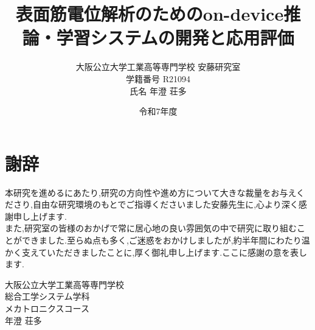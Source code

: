 \documentclass[uplatex,11pt,a4paper]{jsreport}
\title{表面筋電位解析のためのon-device推論・学習システムの開発と応用評価}
\author{大阪公立大学工業高等専門学校 安藤研究室\\
学籍番号 R21094\\
氏名 年澄 荘多}
\date{令和7年度}
\numberwithin{equation}{chapter}
\numberwithin{figure}{chapter}
\numberwithin{table}{chapter}
\begin{document}
\maketitle
\thispagestyle{empty}
\clearpage

\tableofcontents
\clearpage
{}












\renewcommand{\thepage}{\arabic{page}}
\chapter*{謝辞}
本研究を進めるにあたり,研究の方向性や進め方について大きな裁量をお与えくださり,自由な研究環境のもとでご指導くださいました安藤先生に,心より深く感謝申し上げます. \\
また,研究室の皆様のおかげで常に居心地の良い雰囲気の中で研究に取り組むことができました.至らぬ点も多く,ご迷惑をおかけしましたが,約半年間にわたり温かく支えていただきましたことに,厚く御礼申し上げます.ここに感謝の意を表します.

\begin{flushright}
大阪公立大学工業高等専門学校\\
総合工学システム学科\\
メカトロニクスコース\\
年澄 荘多
\end{flushright}
\clearpage
\renewcommand{\thepage}{\arabic{page}}

\appendix
\renewcommand{\thepage}{A-\arabic{page}}

\end{document}
